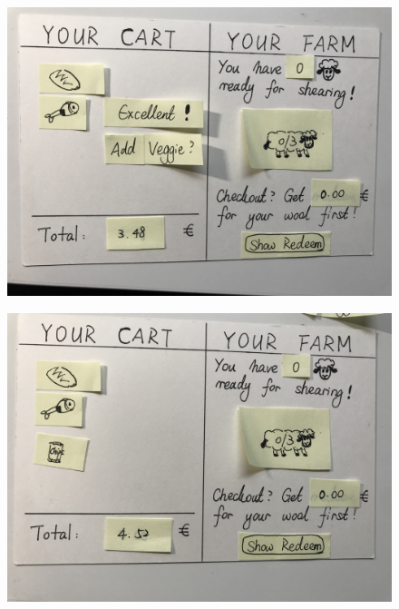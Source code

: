 \documentclass[a4paper,10pt,oneside]{scrreprt}
\begin{document}
\begin{figure}[h]
	\centering
	\includegraphics[scale=0.10, clip, trim={0em 0em 0em 0em}]{images/IMG_0567.jpg}
\end{figure}

\begin{figure}[h]
	\centering
	\includegraphics[scale=0.10, clip, trim={0em 0em 0em 0em}]{images/IMG_0569.jpg}
\end{figure}
\end{document}
